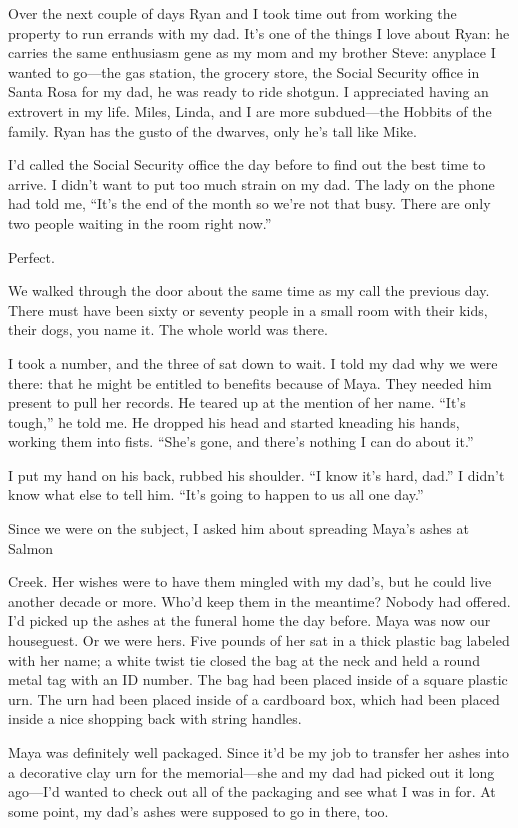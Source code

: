 \documentclass[12pt]{book}
\begin{document}
Over the next couple of days Ryan and I took time out from working the property to run errands with my dad. It's one of the things I love about Ryan: he carries the same enthusiasm gene as my mom and my brother Steve: anyplace I wanted to go---the gas station, the grocery store, the Social Security office in Santa Rosa for my dad, he was ready to ride shotgun. I appreciated having an extrovert in my life. Miles, Linda, and I are more subdued---the Hobbits of the family. Ryan has the gusto of the dwarves, only he's tall like Mike.

I'd called the Social Security office the day before to find out the best time to arrive. I didn't want to put too much strain on my dad. The lady on the phone had told me, ``It's the end of the month so we're not that busy. There are only two people waiting in the room right now.''

Perfect.

We walked through the door about the same time as my call the previous day. There must have been sixty or seventy people in a small room with their kids, their dogs, you name it. The whole world was there.

I took a number, and the three of sat down to wait. I told my dad why we were there: that he might be entitled to benefits because of Maya. They needed him present to pull her records. He teared up at the mention of her name. ``It's tough,'' he told me. He dropped his head and started kneading his hands, working them into fists. ``She's gone, and there's nothing I can do about it.''

I put my hand on his back, rubbed his shoulder. ``I know it's hard, dad.'' I didn't know what else to tell him. ``It's going to happen to us all one day.''

Since we were on the subject, I asked him about spreading Maya's ashes at Salmon

Creek. Her wishes were to have them mingled with my dad's, but he could live another decade or more. Who'd keep them in the meantime? Nobody had offered. I'd picked up the ashes at the funeral home the day before. Maya was now our houseguest. Or we were hers. Five pounds of her sat in a thick plastic bag labeled with her name; a white twist tie closed the bag at the neck and held a round metal tag with an ID number. The bag had been placed inside of a square plastic urn. The urn had been placed inside of a cardboard box, which had been placed inside a nice shopping back with string handles.

Maya was definitely well packaged. Since it'd be my job to transfer her ashes into a decorative clay urn for the memorial---she and my dad had picked out it long ago---I'd wanted to check out all of the packaging and see what I was in for. At some point, my dad's ashes were supposed to go in there, too.
\end{document}
